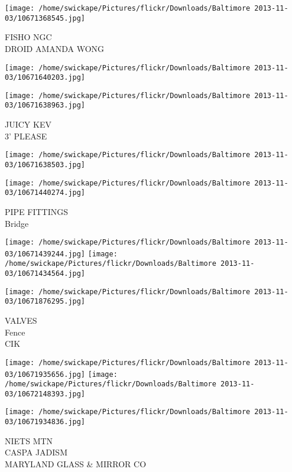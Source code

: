 \documentclass[10pt,letterpaper]{article}
\begin{document}
\vspace{0.25in}
\texttt{[image: /home/swickape/Pictures/flickr/Downloads/Baltimore 2013-11-03/10671368545.jpg]}

FISHO NGC\\
DROID AMANDA WONG\\
\pagebreak

\texttt{[image: /home/swickape/Pictures/flickr/Downloads/Baltimore 2013-11-03/10671640203.jpg]}

\vspace{0.25in}
\texttt{[image: /home/swickape/Pictures/flickr/Downloads/Baltimore 2013-11-03/10671638963.jpg]}

JUICY KEV\\
3' PLEASE\\
\pagebreak

\texttt{[image: /home/swickape/Pictures/flickr/Downloads/Baltimore 2013-11-03/10671638503.jpg]}

\vspace{0.25in}
\texttt{[image: /home/swickape/Pictures/flickr/Downloads/Baltimore 2013-11-03/10671440274.jpg]}

PIPE FITTINGS\\
Bridge\\
\pagebreak

\texttt{[image: /home/swickape/Pictures/flickr/Downloads/Baltimore 2013-11-03/10671439244.jpg]}
\texttt{[image: /home/swickape/Pictures/flickr/Downloads/Baltimore 2013-11-03/10671434564.jpg]}

\vspace{0.25in}
\texttt{[image: /home/swickape/Pictures/flickr/Downloads/Baltimore 2013-11-03/10671876295.jpg]}

VALVES\\
Fence\\
CIK\\
\pagebreak

\texttt{[image: /home/swickape/Pictures/flickr/Downloads/Baltimore 2013-11-03/10671935656.jpg]}
\texttt{[image: /home/swickape/Pictures/flickr/Downloads/Baltimore 2013-11-03/10672148393.jpg]}

\vspace{0.25in}
\texttt{[image: /home/swickape/Pictures/flickr/Downloads/Baltimore 2013-11-03/10671934836.jpg]}

NIETS MTN\\
CASPA JADISM\\
MARYLAND GLASS \& MIRROR CO\\
\pagebreak
\end{document}
